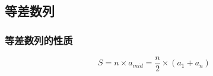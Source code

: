 \subsection{等差数列}

\subsubsection{等差数列的性质}

\[
	S = n \times a_{mid} = \frac{n}{2} \times (a_1 + a_n)
\]